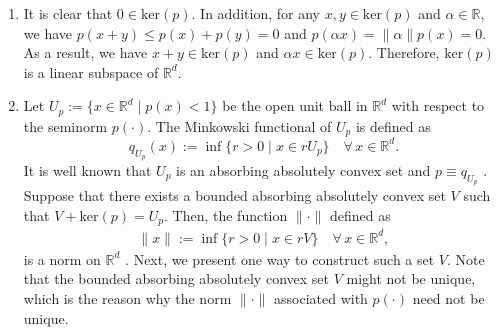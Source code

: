\documentclass[11 pt]{article}
\begin{document}
	\begin{enumerate}[(1)]
		\item  It is clear that $0\in \text{ker}(p)$. In addition, for any $x, y \in \text{ker}(p)$ and $\alpha\in\mathbb{R}$, we have $p(x + y) \leq p(x) + p(y) = 0$ and $p(\alpha x) = \| \alpha \| p(x) = 0$. As a result,
		we have $x + y \in \text{ker}(p)$ and $\alpha x \in \text{ker}(p)$. Therefore, $\text{ker}(p)$ is a linear subspace of $\mathbb{R}^d$.
		\item Let $U_p:=\{x \in \mathbb{R}^d \mid p(x) < 1\}$ be the open unit ball in $\mathbb{R}^d$ with respect to the seminorm $p(\cdot)$. The Minkowski functional of $U_p$ is defined as
		\begin{equation*}
			q_{U_p}(x) := \inf\{r > 0\mid x \in r U_p\} \quad \forall\,x \in \mathbb{R}^d.
		\end{equation*}
		It is well known that $U_p$ is an absorbing absolutely convex set and $p \equiv q_{U_p}$ \cite{narici2010topological,schaefer1971locally}. Suppose that there exists a bounded absorbing absolutely convex set $V$ such that $V + \text{ker}(p) = U_p$. Then, the function $\| \cdot \|$ defined as 
		\begin{align}\label{def:prop:seminorm_properties:norm}
			\| x \| := \inf\{r > 0\mid x \in r V\} \quad \forall\, x \in \mathbb{R}^d,
		\end{align}
		is a norm on $\mathbb{R}^d$ \cite{schaefer1971locally}.  Next, we present one way to construct such a set $V$. Note that the bounded absorbing absolutely convex set $V$ might not be unique, which is the reason why the norm $\| \cdot \|$ associated with $p(\cdot)$ need not be unique.
		

\end{enumerate}
\end{document}
